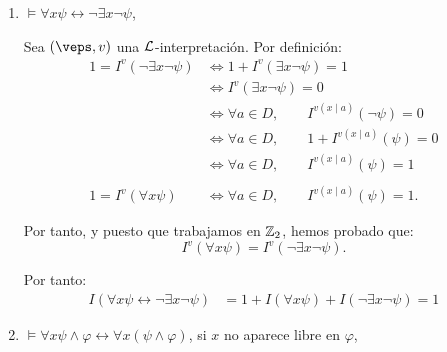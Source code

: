 \begin{ejercicio}
\begin{enumerate}
        Por tanto, y puesto que trabajamos en $\bb{Z}_2$, hemos probado que:
        \begin{equation*}
            I^v(\exists x \psi) =I^v(\neg \forall x \neg \psi).
        \end{equation*}

        Por tanto:
        \begin{align*}
            I( \exists x \psi \leftrightarrow \neg \forall x \neg \psi)
            &= 1+I(\exists x \psi)+I(\neg \forall x \neg \psi)=1
        \end{align*}
        \item $\models \forall x \psi \leftrightarrow \neg \exists x \neg \psi$,
        
        Sea $(\veps,v)$ una $\mathcal{L}$-interpretación. Por definición:
        \begin{align*}
            1 = I^v(\neg \exists x \neg \psi)
            &\iff 1+I^v(\exists x \neg \psi) = 1\\
            &\iff I^{v}( \exists x \neg \psi) = 0\\
            &\iff \forall a\in D,\qquad I^{v(x\mid a)}(\neg \psi) = 0\\
            &\iff \forall a\in D,\qquad 1+I^{v(x\mid a)}(\psi) = 0\\
            &\iff \forall a\in D,\qquad I^{v(x\mid a)}(\psi) = 1\\\\
            1 = I^v(\forall x \psi)
            &\iff \forall a\in D,\qquad I^{v(x\mid a)}(\psi) = 1.
        \end{align*}

        Por tanto, y puesto que trabajamos en $\bb{Z}_2$, hemos probado que:
        \begin{equation*}
            I^v(\forall x \psi) =I^v(\neg \exists x \neg \psi).
        \end{equation*}

        Por tanto:
        \begin{align*}
            I( \forall x \psi \leftrightarrow \neg \exists x \neg \psi)
            &= 1+I(\forall x \psi)+I(\neg \exists x \neg \psi)=1
        \end{align*}
        \item $\models \forall x \psi \wedge \varphi \leftrightarrow \forall x(\psi \wedge \varphi)$, si $x$ no aparece libre en $\varphi$,
        

\end{enumerate}
\end{ejercicio}
